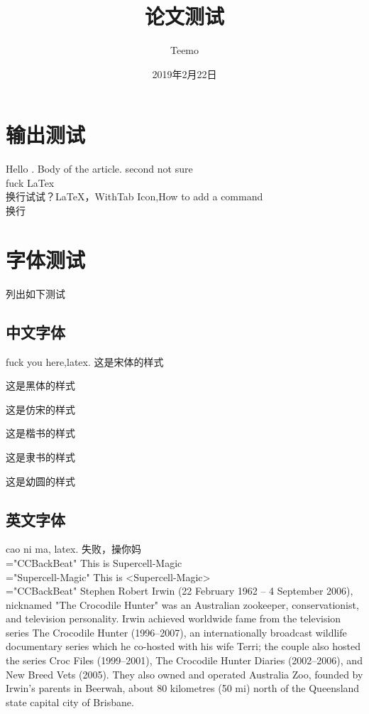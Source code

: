 \documentclass[UTF8]{ctexart}
\title{论文测试}
\author{Teemo}
\date{2019年2月22日}
\begin{document}
\maketitle
\tableofcontents
\section{输出测试}
 Hello \XeLaTeX.
 Body of the article.
 second not sure \\
 fuck LaTex \\
 换行试试？\LaTeX，WithTab Icon,How to add a command \\

 换行
\section{字体测试}
 列出如下测试
 \subsection{中文字体}
     fuck you here,latex.
     {\songti   这是宋体的样式} \par
     {\heiti    这是黑体的样式} \par
     {\fangsong 这是仿宋的样式} \par
     {\kaishu   这是楷书的样式} \par
     {\lishu   这是隶书的样式} \par
     {\youyuan 这是幼圆的样式} \par
 \subsection{英文字体}
     cao ni ma, latex.
     失败，操你妈\\
     {\font\rm="CCBackBeat" \rm This is Supercell-Magic\\}
     {\font\rm="Supercell-Magic" \rm This is <Supercell-Magic>\\}
     {\font\rm="CCBackBeat" \rm Stephen Robert Irwin (22 February 1962 – 4 September 2006),
     nicknamed "The Crocodile Hunter" was an Australian zookeeper, conservationist, and
     television personality. Irwin achieved worldwide fame from the television series The
     Crocodile Hunter (1996–2007), an internationally broadcast wildlife documentary series
     which he co-hosted with his wife Terri; the couple also hosted the series Croc Files
     (1999–2001), The Crocodile Hunter Diaries (2002–2006), and New Breed Vets (2005).
     They also owned and operated Australia Zoo, founded by Irwin's parents in Beerwah,
     about 80 kilometres (50 mi) north of the Queensland state capital city of Brisbane.}\\
\end{document}
